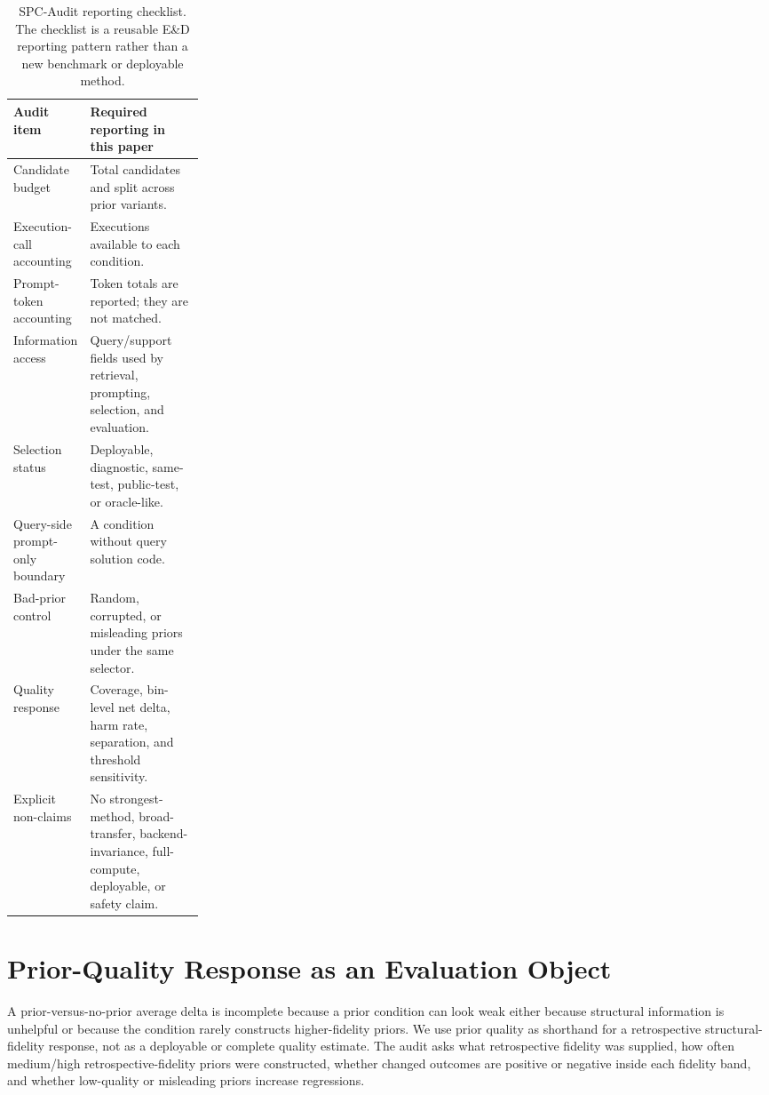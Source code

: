 \documentclass{article}
\begin{document}
\begin{table}[t]
\centering
\small
\begin{tabularx}{\linewidth}{p{0.25\linewidth}Y}
\toprule
Audit item & Required reporting in this paper \\
\midrule
Candidate budget & Total candidates and split across prior variants. \\
Execution-call accounting & Executions available to each condition. \\
Prompt-token accounting & Token totals are reported; they are not matched. \\
Information access & Query/support fields used by retrieval, prompting, selection, and evaluation. \\
Selection status & Deployable, diagnostic, same-test, public-test, or oracle-like. \\
Query-side prompt-only boundary & A condition without query solution code. \\
Bad-prior control & Random, corrupted, or misleading priors under the same selector. \\
Quality response & Coverage, bin-level net delta, harm rate, separation, and threshold sensitivity. \\
Explicit non-claims & No strongest-method, broad-transfer, backend-invariance, full-compute, deployable, or safety claim. \\
\bottomrule
\end{tabularx}
\caption{SPC-Audit reporting checklist. The checklist is a reusable E\&D reporting pattern rather than a new benchmark or deployable method.}
\label{tab:audit-checklist}
\end{table}

\section{Prior-Quality Response as an Evaluation Object}
A prior-versus-no-prior average delta is incomplete because a prior condition can look weak either because structural information is unhelpful or because the condition rarely constructs higher-fidelity priors. We use prior quality as shorthand for a retrospective structural-fidelity response, not as a deployable or complete quality estimate. The audit asks what retrospective fidelity was supplied, how often medium/high retrospective-fidelity priors were constructed, whether changed outcomes are positive or negative inside each fidelity band, and whether low-quality or misleading priors increase regressions.
\end{document}

